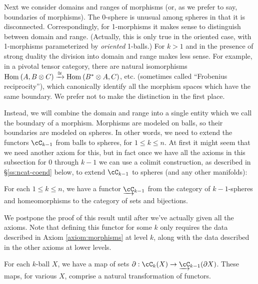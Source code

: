 Next we consider domains and ranges of morphisms (or, as we prefer to say, boundaries
of morphisms).
The 0-sphere is unusual among spheres in that it is disconnected.
Correspondingly, for 1-morphisms it makes sense to distinguish between domain and range.
(Actually, this is only true in the oriented case, with 1-morphisms parameterized
by {\it oriented} 1-balls.)
For $k>1$ and in the presence of strong duality the division into domain and range makes less sense.
For example, in a pivotal tensor category, there are natural isomorphisms $\operatorname{Hom}_{}\left(A,B \otimes C\right) \xrightarrow{\cong} \operatorname{Hom}_{}\left(B^* \otimes A,C\right)$, etc. 
(sometimes called ``Frobenius reciprocity''), which canonically identify all the morphism spaces which have the same boundary.
We prefer not to make the distinction in the first place.

Instead, we will combine the domain and range into a single entity which we call the 
boundary of a morphism.
Morphisms are modeled on balls, so their boundaries are modeled on spheres.
In other words, we need to extend the functors $\cC_{k-1}$ from balls to spheres, for 
$1\le k \le n$.
At first it might seem that we need another axiom for this, but in fact once we have
all the axioms in this subsection for $0$ through $k-1$ we can use a colimit
construction, as described in \S\ref{ss:ncat-coend} below, to extend $\cC_{k-1}$
to spheres (and any other manifolds):

\begin{lem}
\label{lem:spheres}
For each $1 \le k \le n$, we have a functor $\cl{\cC}_{k-1}$ from 
the category of $k{-}1$-spheres and 
homeomorphisms to the category of sets and bijections.
\end{lem}

We postpone the proof of this result until after we've actually given all the axioms.
Note that defining this functor for some $k$ only requires the data described in Axiom \ref{axiom:morphisms} at level $k$, 
along with the data described in the other axioms at lower levels. 


\begin{axiom}[Boundaries]\label{nca-boundary}
For each $k$-ball $X$, we have a map of sets $\bd: \cC_k(X)\to \cl{\cC}_{k-1}(\bd X)$.
These maps, for various $X$, comprise a natural transformation of functors.
\end{axiom}

